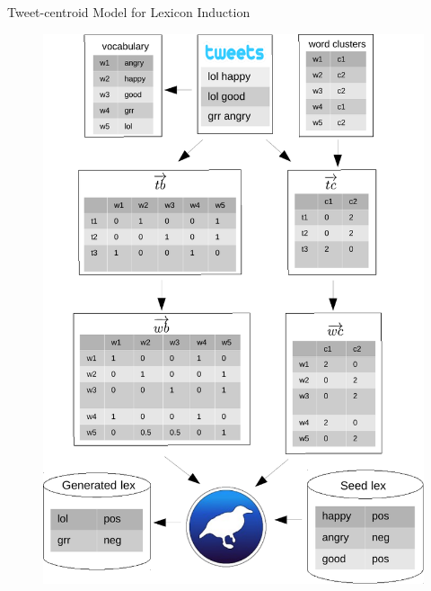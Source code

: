 \documentclass[handout]{beamer}
\begin{document}
\begin{frame}{Tweet-centroid Model for Lexicon Induction}

\begin{figure}[htb]
	\centering
	 \includegraphics[scale=0.4]{pics/sigirmodel.pdf}
\end{figure}



\end{frame}
\end{document}
